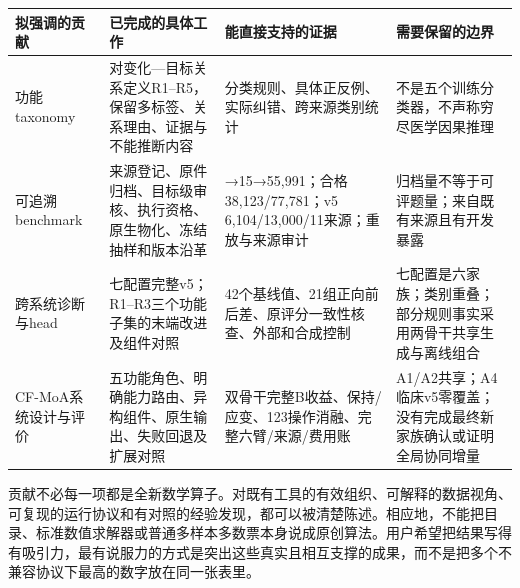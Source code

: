 \documentclass[
  11pt,
  a4paper,
]{article}
\newcounter{none} %
\begin{document}
{\def\LTcaptype{none} %
\begin{longtable}[]{@{}
  >{\raggedright\arraybackslash}p{}
  >{\raggedright\arraybackslash}p{}
  >{\raggedright\arraybackslash}p{}
  >{\raggedright\arraybackslash}p{}@{}}
\toprule\noalign{}
\begin{minipage}[b]{\linewidth}\raggedright
拟强调的贡献
\end{minipage} & \begin{minipage}[b]{\linewidth}\raggedright
已完成的具体工作
\end{minipage} & \begin{minipage}[b]{\linewidth}\raggedright
能直接支持的证据
\end{minipage} & \begin{minipage}[b]{\linewidth}\raggedright
需要保留的边界
\end{minipage} \\
\midrule\noalign{}
\endhead
\bottomrule\noalign{}
\endlastfoot
功能taxonomy &
对变化---目标关系定义R1--R5，保留多标签、关系理由、证据与不能推断内容 &
分类规则、具体正反例、实际纠错、跨来源类别统计 &
不是五个训练分类器，不声称穷尽医学因果推理 \\
可追溯benchmark &
来源登记、原件归档、目标级审核、执行资格、原生物化、冻结抽样和版本沿革 &
26→15→55,991；合格38,123/77,781；v5 6,104/13,000/11来源；重放与来源审计
& 归档量不等于可评题量；来自既有来源且有开发暴露 \\
跨系统诊断与head & 七配置完整v5；R1--R3三个功能子集的末端改进及组件对照
& 42个基线值、21组正向前后差、原评分一致性核查、外部和合成控制 &
七配置是六家族；类别重叠；部分规则事实采用两骨干共享生成与离线组合 \\
CF-MoA系统设计与评价 &
五功能角色、明确能力路由、异构组件、原生输出、失败回退及扩展对照 &
双骨干完整B收益、保持/应变、123操作消融、完整六臂/来源/费用账 &
A1/A2共享；A4临床v5零覆盖；没有完成最终新家族确认或证明全局协同增量 \\
\end{longtable}
}

贡献不必每一项都是全新数学算子。对既有工具的有效组织、可解释的数据视角、可复现的运行协议和有对照的经验发现，都可以被清楚陈述。相应地，不能把目录、标准数值求解器或普通多样本多数票本身说成原创算法。用户希望把结果写得有吸引力，最有说服力的方式是突出这些真实且相互支撑的成果，而不是把多个不兼容协议下最高的数字放在同一张表里。
\end{document}
